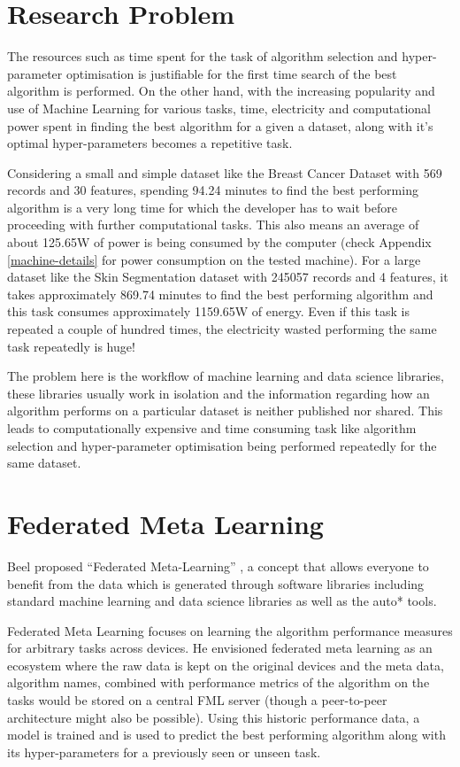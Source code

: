 \section{Research Problem}
The resources such as time spent for the task of algorithm selection and hyper-parameter optimisation is justifiable for the first time search of the best algorithm is performed. On the other hand, with the increasing popularity and use of Machine Learning for various tasks, time, electricity and computational power spent in finding the best algorithm for a given a dataset, along with it's optimal hyper-parameters becomes a repetitive task. 

Considering a small and simple dataset like the Breast Cancer Dataset with 569 records and 30 features, spending 94.24 minutes to find the best performing algorithm is a very long time for which the developer has to wait before proceeding with further computational tasks. This also means an average of about 125.65W of power is being consumed by the computer (check Appendix \ref{machine-details} for power consumption on the tested machine). For a large dataset like the Skin Segmentation dataset with 245057 records and 4 features, it takes approximately 869.74 minutes to find the best performing algorithm and this task consumes approximately 1159.65W of energy. Even if this task is repeated a couple of hundred times, the electricity wasted performing the same task repeatedly is huge!

The problem here is the workflow of machine learning and data science libraries, these libraries usually work in isolation and the information regarding how an algorithm performs on a particular dataset is neither published nor shared. This leads to computationally expensive and time consuming task like algorithm selection and hyper-parameter optimisation being performed repeatedly for the same dataset.

\section{Federated Meta Learning}
Beel proposed “Federated Meta-Learning” \citep{fml}, a concept that allows everyone to benefit from the data which is generated through software libraries including standard machine learning and data science libraries as well as the auto* tools. 

Federated Meta Learning focuses on learning the algorithm performance measures for arbitrary tasks across devices. He envisioned federated meta learning as an ecosystem where the raw data is kept on the original  devices and the meta data, algorithm names, combined with performance metrics of the algorithm on the tasks would be stored on a central FML server (though a peer-to-peer architecture might also be possible). Using this historic performance data, a model is trained and is used to predict the best performing algorithm along with its hyper-parameters for a previously seen or unseen task.


